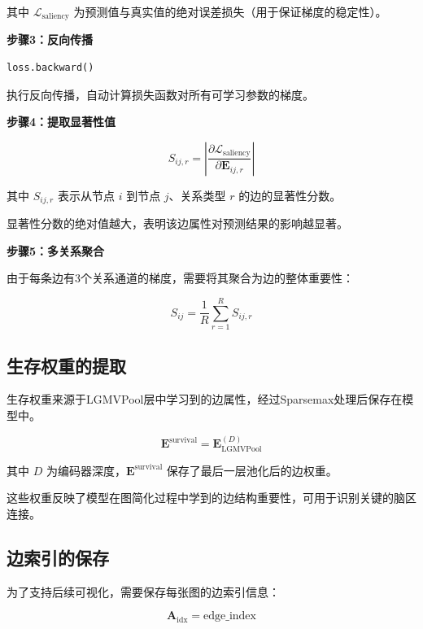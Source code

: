 其中 $\mathcal{L}_{\text{saliency}}$ 为预测值与真实值的绝对误差损失（用于保证梯度的稳定性）。

\textbf{步骤3：反向传播}

\begin{verbatim}
loss.backward()
\end{verbatim}

执行反向传播，自动计算损失函数对所有可学习参数的梯度。

\textbf{步骤4：提取显著性值}

\begin{equation}
S_{ij,r} = \left| \frac{\partial \mathcal{L}_{\text{saliency}}}{\partial \mathbf{E}_{ij,r}} \right|
\end{equation}

其中 $S_{ij,r}$ 表示从节点 $i$ 到节点 $j$、关系类型 $r$ 的边的显著性分数。

显著性分数的绝对值越大，表明该边属性对预测结果的影响越显著。

\textbf{步骤5：多关系聚合}

由于每条边有3个关系通道的梯度，需要将其聚合为边的整体重要性：

\begin{equation}
S_{ij} = \frac{1}{R} \sum_{r=1}^{R} S_{ij,r}
\end{equation}

\subsection{生存权重的提取}

生存权重来源于LGMVPool层中学习到的边属性，经过Sparsemax处理后保存在模型中。

\begin{equation}
\mathbf{E}^{\text{survival}} = \mathbf{E}^{(D)}_{\text{LGMVPool}}
\end{equation}

其中 $D$ 为编码器深度，$\mathbf{E}^{\text{survival}}$ 保存了最后一层池化后的边权重。

这些权重反映了模型在图简化过程中学到的边结构重要性，可用于识别关键的脑区连接。

\subsection{边索引的保存}

为了支持后续可视化，需要保存每张图的边索引信息：

\begin{equation}
\mathbf{A}_{\text{idx}} = \text{edge\_index}
\end{equation}

